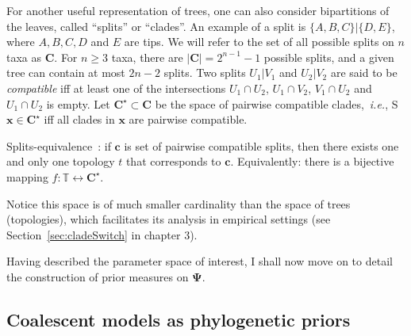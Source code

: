 For another useful representation of trees, one can also consider bipartitions of the leaves, called ``splits'' or ``clades''. %
An example of a split is $\{A, B, C\} | \{ D, E\}$, where $A, B, C, D$ and $E$ are tips.
We will refer to the set of all possible splits on $n$ taxa as $\boldsymbol C$.
For $n \geq 3$ taxa, there are $|\boldsymbol C| = 2^{n-1}-1$ possible splits, and a given tree can contain at most $2n-2$ splits.
Two splits $U_1 | V_1$ and $U_2 | V_2$ are said to be \textit{compatible} iff at least one of the intersections $U_1 \cap U_2$, $U_1 \cap V_2$, $V_1 \cap U_2$ and $U_1 \cap U_2$ is empty.
Let $\boldsymbol C^\star \subset \boldsymbol C$ be  the space of pairwise compatible clades,~\textit{i.e.}, S $\boldsymbol x \in \boldsymbol C^\star$ iff all clades in $\boldsymbol x$ are pairwise compatible.
\begin{theorem}
\label{thm:splitstheorem}
 Splits-equivalence~\citep{Buneman1971}: if $\boldsymbol c$ is set of pairwise compatible splits, then there exists one and only one topology $t$ that corresponds to $\boldsymbol c$.
 Equivalently: there is a bijective mapping $f: \mathbb{T}  \leftrightarrow \boldsymbol C^\star$.
\end{theorem}
Notice this space is of much smaller cardinality than the space of trees (topologies), which facilitates its analysis in empirical settings (see Section~\ref{sec:cladeSwitch} in chapter 3).

Having described the parameter space of interest, I shall now move on to detail the construction of prior measures on $\boldsymbol\Psi$.

\subsection{Coalescent models as phylogenetic priors}
\label{sec:coalescent_priors}

